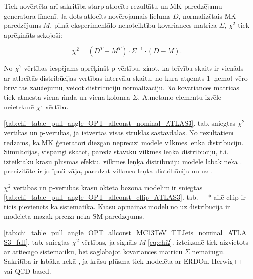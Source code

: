 Tiek novērtēta arī sakritība starp atlocīto rezultātu un MK paredzējumu ģeneratora līmenī. Ja dots atlocīts novērojamais lielums $D$, normalizētais MK paredzējums $M$, pilnā eksperimentālo nenoteiktību kovariances matrica $\Sigma$, $\chi^{2}$ tiek aprēķināts sekojoši:

\begin{equation}
  \chi^{2}=(D^{T}-M^{T})\cdot\Sigma^{-1}\cdot(D-M).
  \label{eq:chi2}
\end{equation}

No $\chi^{2}$ vērtības iespējams aprēķināt p-vērtību, zinot, ka brīvību skaits ir vienāds ar atlocītās distribūcijas vertības intervālu skaitu, no kura atņemts 1, ņemot vēro brīvības zaudējumu, veicot distribūciju normalizāciju. No kovariances matricas tiek atmesta viena rinda un viena kolonna $\Sigma$. Atmetamo elementu izvēle neietekmē $\chi^{2}$ vērtību.

\ref{tab:chi_table_pull_angle_OPT_allconst_nominal_ATLAS3}. tab. sniegtas \pullangle  $\chi^{2}$ vērtības un p-vērtības, ja ietvertas visas strūklas sastāvdaļas. No rezultātiem redzams, ka MK ģeneratori diezgan neprecīzi modelē vilkmes leņķa distribūciju. Simulācijas, vispārīgi skatot, paredz stāvāku vilkmes leņķa distribūciju, t.i. izteiktāku krāsu plūsmas efektu. \HERWIGpp vilkmes leņķa distribūciju modelē labāk nekā .  precizitāte ir jo īpaši vāja, paredzot vilkmes leņķa distribūciju no \scndleadingjet uz \leadingjet.

$\chi^{2}$ vērtības un p-vērtības krāsu okteta \PW bozona modelim ir sniegtas \ref{tab:chi_table_pull_angle_OPT_allconst_cflip_ATLAS3}. tab. \POWHEG+ * ailē \ttbar cflip ir ticis pievienots kā \ttbar sistemātika. Krāsu apmaiņas modelī \pullangle no \leadingjet uz \scndleadingjet distribūcija ir modelēta mazāk precizī nekā SM paredzējums. 
  
\ref{tab:chi_table_pull_angle_OPT_allconst_MC13TeV_TTJets_nominal_ATLAS3_full}. tab. sniegtas $\chi^{2}$ vērtības, ja signāls $M$ \ref{eq:chi2}. izteiksmē tiek aizvietots ar attiecīgo sistemātiku, bet saglabājot kovariances matricu $\Sigma$ nemainīgu. Sakritība ir labāka nekā \ttbar, ja krāsu plūsma tiek modelēta ar \ttbar ERDOn, \ttbar Herwig++ vai \ttbar QCD based.











